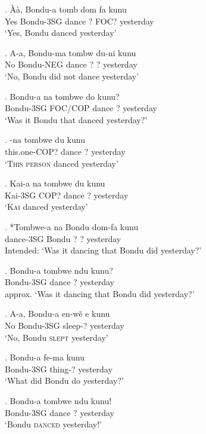 \documentclass{assets/fieldnotes}
\begin{document}
{

\exg. Àà, Bondu-a tomb dom fa kunu\\
Yes Bondu-3SG dance ? FOC? yesterday\\
`Yes, Bondu danced yesterday'


\exg. A-a, Bondu-ma tombw du-ni kunu\\
No Bondu-NEG dance ? ? yesterday\\
`No, Bondu did not dance yesterday'

\exg. Bondu-a na tombwe do kunu?\\
Bondu-3SG FOC/COP dance ? yesterday\\
`Was it Bondu that danced yesterday?'

\exg. -na tombwe du kunu\\
this.one-COP? dance ? yesterday\\
`\textsc{This person} danced yesterday'

\exg. Kai-a na tombwe du kunu\\
Kai-3SG COP? dance ? yesterday\\
`\textsc{Kai} danced yesterday'

\exg. *Tombwe-a na Bondu dom-fa kunu\\
dance-3SG Bondu ? ? yesterday\\
Intended: `Was it dancing that Bondu did yesterday?'

\exg. Bondu-a tombwe ndu kunu?\\
Bondu-3SG dance ? yesterday\\
approx. `Was it dancing that Bondu did yesterday?'

\exg. A-a, Bondu-a en-wẽ e kunu\\
No Bondu-3SG sleep-? yesterday\\
`No, Bondu \textsc{slept} yesterday'

\exg. Bondu-a fe-ma kunu\\
Bondu-3SG thing-? yesterday\\
`What did Bondu do yesterday?'


\exg. Bondu-a tombwe ndu kunu!\\
Bondu-3SG dance ? yesterday\\
`Bondu \textsc{danced} yesterday!'

}
\end{document}
